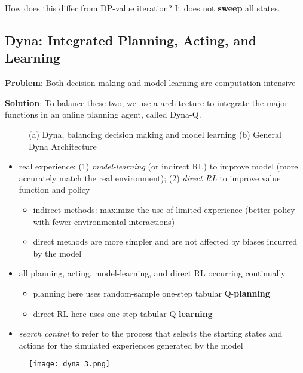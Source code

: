 \documentclass[sutton_barto_notes.tex]{subfiles}
\begin{document}
How does this differ from DP-value iteration? It does not \textbf{sweep} all states.


\subsection{Dyna: Integrated Planning, Acting, and Learning}

\textbf{Problem}: Both decision making and model learning are computation-intensive

\textbf{Solution}: To balance these two, we use a architecture to integrate the major functions in an online planning agent, called Dyna-Q.

\begin{figure}[!h]
    \centering
    \caption{ (a) Dyna, balancing decision making and model learning (b) General Dyna Architecture }
    \label{fig:dyna}
\end{figure}

\begin{itemize}
\item real experience: (1) \textit{model-learning} (or indirect RL) to improve model (more accurately match the real environment); (2) \textit{direct RL} to improve value function and policy
\begin{itemize}
	\item indirect methods: maximize the use of limited experience (better policy with fewer environmental interactions)
	\item direct methods are more simpler and are not affected by biases incurred by the model
\end{itemize}
\item all planning, acting, model-learning, and direct RL occurring continually
\begin{itemize}
	\item planning here uses random-sample one-step tabular Q-\textbf{planning}
	\item direct RL here uses one-step tabular Q-\textbf{learning}
\end{itemize}
\item \textit{search control} to refer to the process that selects the starting states and actions for the simulated experiences generated by the model
\end{itemize}

\begin{figure}[!h]
  \centering
  \texttt{[image: dyna\_3.png]}
  \label{fig:dyna3}
\end{figure}
\end{document}
